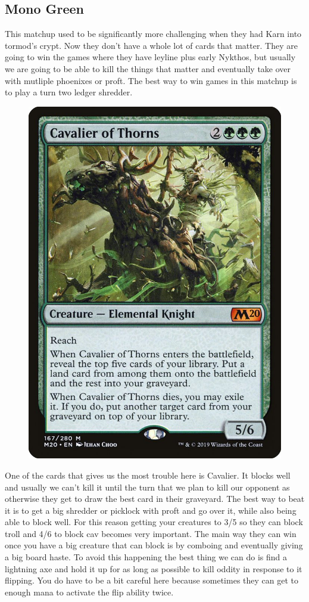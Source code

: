 \documentclass[12pt]{article}
\begin{document}
\subsection{Mono Green}
This matchup used to be significantly more challenging when they had Karn into tormod's crypt. Now they don't have a whole lot of cards that matter. They are going to win the games where they have leyline plus early Nykthos, but usually we are going to be able to kill the things that matter and eventually take over with mutliple phoenixes or proft. The best way to win games in this matchup is to play a turn two ledger shredder.

\begin{figure}
    \includegraphics[width=0.9\linewidth]{Cards/cav.jpg}
\end{figure}

One of the cards that gives us the most trouble here is Cavalier. It blocks well and usually we can't kill it until the turn that we plan to kill our opponent as otherwise they get to draw the best card in their graveyard. The best way to beat it is to get a big shredder or picklock with proft and go over it, while also being able to block well. For this reason getting your creatures to 3/5 so they can block troll and 4/6 to block cav becomes very important. The main way they can win once you have a big creature that can block is by comboing and eventually giving a big board haste. To avoid this happening the best thing we can do is find a lightning axe and hold it up for as long as possible to kill oddity in response to it flipping. You do have to be a bit careful here because sometimes they can get to enough mana to activate the flip ability twice.
\end{document}
